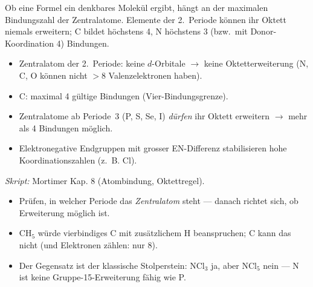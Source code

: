 
Ob eine Formel ein denkbares Molekül ergibt, hängt an der maximalen
Bindungszahl der Zentralatome. Elemente der 2.\ Periode können ihr Oktett
niemals erweitern; C bildet höchstens 4, N höchstens 3 (bzw.\ mit
Donor-Koordination 4) Bindungen.

\begin{werkzeugkasten}
\begin{itemize}
  \item Zentralatom der 2.\ Periode: keine $d$-Orbitale $\to$ keine
        Oktetterweiterung (N, C, O können nicht $>8$ Valenzelektronen haben).
  \item C: maximal 4 gültige Bindungen (Vier-Bindungsgrenze).
  \item Zentralatome ab Periode~3 (P, S, Se, I) \textit{dürfen} ihr Oktett
        erweitern $\to$ mehr als 4 Bindungen möglich.
  \item Elektronegative Endgruppen mit grosser EN-Differenz stabilisieren
        hohe Koordinationszahlen (z.\ B. $\mathrm{Cl}$).
\end{itemize}
\textit{Skript:} Mortimer Kap. 8 (Atombindung, Oktettregel).
\end{werkzeugkasten}

\begin{achtung}
\begin{itemize}
  \item Prüfen, in welcher Periode das \textit{Zentralatom} steht --- danach
        richtet sich, ob Erweiterung möglich ist.
  \item $\mathrm{CH_5}$ würde vierbindiges C mit zusätzlichem H beanspruchen;
        C kann das nicht (und Elektronen zählen: nur 8).
  \item Der Gegensatz ist der klassische Stolperstein:
        $\mathrm{NCl_3}$ ja, aber $\mathrm{NCl_5}$ nein --- N ist keine
        Gruppe-15-Erweiterung fähig wie P.
\end{itemize}
\end{achtung}
